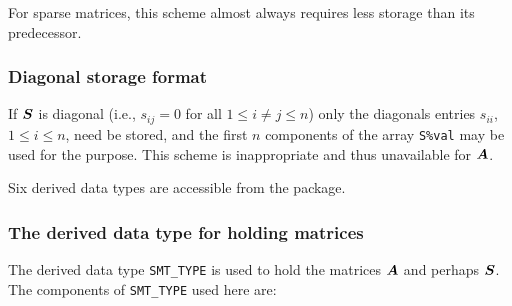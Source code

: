 \documentclass{galahad}
\begin{document}
For sparse matrices, this scheme almost always requires less storage than
its predecessor.

\subsubsection{Diagonal storage format}\label{diagonal}
If ${\bm{S}}$ is diagonal (i.e., $s_{ij} = 0$ for all $1 \leq i \neq j \leq n$)
only the diagonals entries $s_{ii}$, $1 \leq i \leq n$,  need be stored,
and the first $n$ components of the array {\tt S\%val} may be used for
the purpose. This scheme is inappropriate and thus unavailable for ${\bm{A}}$.








\galtypes
Six derived data types are accessible from the package.


\subsubsection{The derived data type for holding matrices}\label{typesmt}
The derived data type {\tt SMT\_TYPE} is used to hold the matrices ${\bm{A}}$
and perhaps ${\bm{S}}$.
The components of {\tt SMT\_TYPE} used here are:
\end{document}
